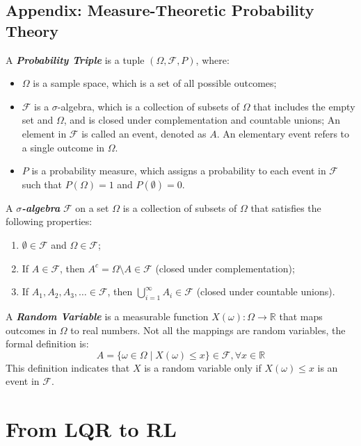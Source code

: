 \documentclass[10pt]{elegantbook}
\newcommand{\mydefination}[1]{\textbf{\textit{\textcolor{structurecolor}{#1}}}}
\begin{document}
\section{Appendix: Measure-Theoretic Probability Theory}
A \mydefination{Probability Triple} is a tuple $(\Omega, \mathcal F, P)$, where:
\begin{itemize}
    \item $\Omega$ is a sample space, which is a set of all possible outcomes;
    \item $\mathcal F$ is a $\sigma$-algebra, which is a collection of subsets of $\Omega$ that includes the empty set and $\Omega$, and is closed under complementation and countable unions;
    An element in $\mathcal F$ is called an event, denoted as $A$. An elementary event refers to a single outcome in $\Omega$.
    \item $P$ is a probability measure, which assigns a probability to each event in $\mathcal F$ such that $P(\Omega) = 1$ and $P(\emptyset) = 0$.
\end{itemize}

\begin{definition}
    A \mydefination{$\sigma$-algebra} $\mathcal F$ on a set $\Omega$ is a collection of subsets of $\Omega$ that satisfies the following properties:
    \begin{enumerate}
        \item $\emptyset \in \mathcal F$ and $\Omega \in \mathcal F$;
        \item If $A \in \mathcal F$, then $A^c = \Omega \setminus A \in \mathcal F$ (closed under complementation);
        \item If $A_1, A_2, A_3, \ldots \in \mathcal F$, then $\bigcup_{i=1}^{\infty} A_i \in \mathcal F$ (closed under countable unions).
    \end{enumerate}
\end{definition}

A \mydefination{Random Variable} is a measurable function $X(\omega): \Omega \rightarrow \mathbb R$ that maps outcomes in $\Omega$ to real numbers.
Not all the mappings are random variables, the formal definition is:
\[ A = \{ \omega \in \Omega \mid X(\omega) \leq x \} \in \mathcal F, \forall x \in \mathbb R \]
This definition indicates that $X$ is a random variable only if $X(\omega) \leq x$ is an event in $\mathcal F$.



\chapter{From LQR to RL}
\end{document}
